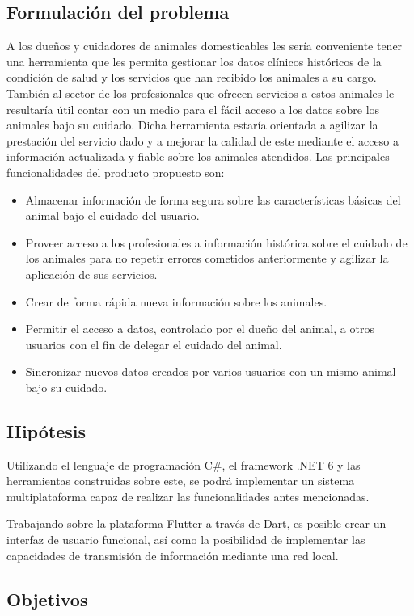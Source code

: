 \subsection*{Formulaci\'on del problema}

A los dueños y cuidadores de animales domesticables les sería conveniente tener una herramienta que les permita gestionar los datos clínicos históricos de la condición de salud y los servicios que han recibido los animales a su cargo. También al sector de los profesionales que ofrecen servicios a estos animales le resultaría útil contar con un medio para el fácil acceso a los datos sobre los animales bajo su cuidado. Dicha herramienta estaría orientada a agilizar la prestación del servicio dado y a mejorar la calidad de este mediante el acceso a información actualizada y fiable sobre los animales atendidos. Las principales funcionalidades del producto propuesto son:
\begin{itemize}
\item Almacenar información de forma segura sobre las características básicas del animal bajo el cuidado del usuario.
\item Proveer acceso a los profesionales a información histórica sobre el cuidado de los animales para no repetir errores cometidos anteriormente y agilizar la aplicación de sus servicios.
\item Crear de forma rápida nueva información sobre los animales.
\item Permitir el acceso a datos, controlado por el dueño del animal, a otros usuarios con el fin de delegar el cuidado del animal.
\item Sincronizar nuevos datos creados por varios usuarios con un mismo animal bajo su cuidado.
\end{itemize}

\subsection*{Hip\'otesis}
Utilizando el lenguaje de programación C\#, el framework .NET 6 y las herramientas construidas sobre este, se podrá implementar un sistema multiplataforma capaz de realizar las funcionalidades antes mencionadas.

Trabajando sobre la plataforma Flutter a trav\'es de Dart, es posible crear un interfaz de usuario funcional, as\'i como la posibilidad de implementar las capacidades de transmisi\'on de informaci\'on mediante una red local.

\subsection*{Objetivos}

